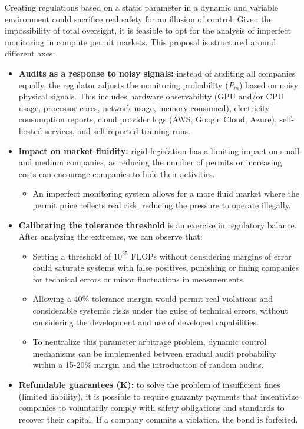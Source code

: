 Creating regulations based on a static parameter in a dynamic and variable environment could sacrifice real safety for an illusion of control. Given the impossibility of total oversight, it is feasible to opt for the analysis of imperfect monitoring in compute permit markets. This proposal is structured around different axes:

\begin{itemize}
    \item \textbf{Audits as a response to noisy signals:} instead of auditing all companies equally, the regulator adjusts the monitoring probability ($P_m$) based on noisy physical signals. This includes hardware observability (GPU and/or CPU usage, processor cores, network usage, memory consumed), electricity consumption reports, cloud provider logs (AWS, Google Cloud, Azure), self-hosted services, and self-reported training runs. 
    
    \item I\textbf{mpact on market fluidity:} rigid legislation has a limiting impact on small and medium companies, as reducing the number of permits or increasing costs can encourage companies to hide their activities.
    \begin{itemize}
        \item An imperfect monitoring system allows for a more fluid market where the permit price reflects real risk, reducing the pressure to operate illegally.
\end{itemize}
    
    \item \textbf{Calibrating the tolerance threshold} is an exercise in regulatory balance. After analyzing the extremes, we can observe that:
    \begin{itemize}
        \item Setting a threshold of $10^{25}$ FLOPs without considering margins of error could saturate systems with false positives, punishing or fining companies for technical errors or minor fluctuations in measurements.
        
        \item Allowing a 40\% tolerance margin would permit real violations and considerable systemic risks under the guise of technical errors, without considering the development and use of developed capabilities.
        
        \item To neutralize this parameter arbitrage problem, dynamic control mechanisms can be implemented between gradual audit probability within a 15-20\% margin and the introduction of random audits.
    \end{itemize}
    
    \item \textbf{Refundable guarantees (K):} to solve the problem of insufficient fines (limited liability), it is possible to require guaranty payments that incentivize companies to voluntarily comply with safety obligations and standards to recover their capital. If a company commits a violation, the bond is forfeited.
\end{itemize}

